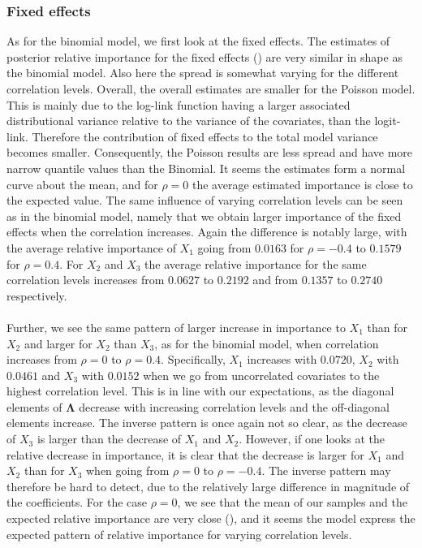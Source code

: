 \subsubsection{Fixed effects}
As for the binomial model, we first look at the fixed effects. The estimates of posterior relative importance for the fixed effects () are very similar in shape as the binomial model. Also here the spread is somewhat varying for the different correlation levels. Overall, the overall estimates are smaller for the Poisson model. This is mainly due to the log-link function having a larger associated distributional variance relative to the variance of the covariates, than the logit-link. Therefore the contribution of fixed effects to the total model variance becomes smaller. Consequently, the Poisson results are less spread and have more narrow quantile values than the Binomial. It seems the estimates form a normal curve about the mean, and for $\rho=0$ the average estimated importance is close to the expected value. The same influence of varying correlation levels can be seen as in the binomial model, namely that we obtain larger importance of the fixed effects when the correlation increases. Again the difference is notably large, with the average relative importance of $X_1$ going from $0.0163$ for $\rho=-0.4$ to $0.1579$ for $\rho=0.4$. For $X_2$ and $X_3$ the average relative importance for the same correlation levels increases from $0.0627$ to $0.2192$ and from $0.1357$ to $0.2740$ respectively.
\\
\\
Further, we see the same pattern of larger increase in importance to $X_1$ than for $X_2$ and larger for $X_2$ than $X_3$, as for the binomial model, when correlation increases from $\rho=0$ to $\rho=0.4$. Specifically, $X_1$ increases with $0.0720$, $X_2$ with $0.0461$ and $X_3$ with $0.0152$ when we go from uncorrelated covariates to the highest correlation level. This is in line with our expectations, as the diagonal elements of $\boldsymbol{\Lambda}$ decrease with increasing correlation levels and the off-diagonal elements increase. The inverse pattern is once again not so clear, as the decrease of $X_3$ is larger than the decrease of $X_1$ and $X_2$. However, if one looks at the relative decrease in importance, it is clear that the decrease is larger for $X_1$ and $X_2$ than for $X_3$ when going from $\rho=0$ to $\rho=-0.4$. The inverse pattern may therefore be hard to detect, due to the relatively large difference in magnitude of the coefficients. For the case $\rho=0$, we see that the mean of our samples and the expected relative importance are very close (), and it seems the model express the expected pattern of relative importance for varying correlation levels.
